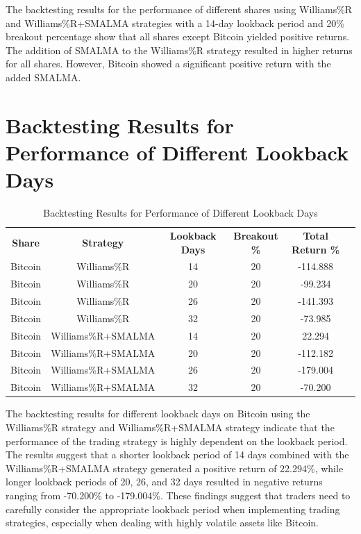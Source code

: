 The backtesting results for the performance of different shares using Williams\%R and Williams\%R+SMALMA strategies with a 14-day lookback period and 20\% breakout percentage show that all shares except Bitcoin yielded positive returns. The addition of SMALMA to the Williams\%R strategy resulted in higher returns for all shares. However, Bitcoin showed a significant positive return with the added SMALMA.


\section{Backtesting Results for Performance of Different Lookback Days}

\begin{table}[h!]
\centering
\caption{Backtesting Results for Performance of Different Lookback Days}
\label{table:backtesting2}
\begin{tabular}{|c|c|c|c|c|c|}
\hline
\textbf{Share} & \textbf{Strategy} & \textbf{Lookback Days} & \textbf{Breakout \%} & \textbf{Total Return \%} \\


Bitcoin & Williams\%R & 14 & 20 & -114.888 \\

Bitcoin & Williams\%R & 20 & 20 & -99.234 \\

Bitcoin & Williams\%R & 26 & 20 & -141.393 \\

Bitcoin & Williams\%R & 32 & 20 & -73.985 \\

Bitcoin & Williams\%R+SMALMA & 14 & 20 & 22.294 \\

Bitcoin & Williams\%R+SMALMA & 20 & 20 & -112.182 \\

Bitcoin & Williams\%R+SMALMA & 26 & 20 & -179.004 \\

Bitcoin & Williams\%R+SMALMA & 32 & 20 & -70.200 \\

\hline
\end{tabular}
\end{table}
The backtesting results for different lookback days on Bitcoin using the Williams\%R strategy and Williams\%R+SMALMA strategy indicate that the performance of the trading strategy is highly dependent on the lookback period. The results suggest that a shorter lookback period of 14 days combined with the Williams\%R+SMALMA strategy generated a positive return of 22.294\%, while longer lookback periods of 20, 26, and 32 days resulted in negative returns ranging from -70.200\% to -179.004\%. These findings suggest that traders need to carefully consider the appropriate lookback period when implementing trading strategies, especially when dealing with highly volatile assets like Bitcoin.
